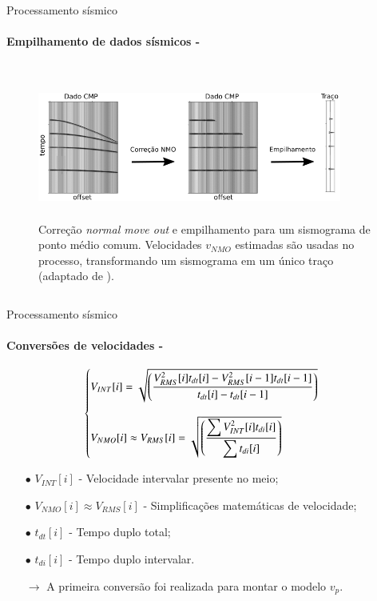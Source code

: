 \documentclass[xcolor=dvipsnames,t]{beamer}
\begin{document}
\begin{frame}{Processamento sísmico}
\framesubtitle{Empilhamento de dados sísmicos - }	

\begin{columns}[onlytextwidth, T]
	\begin{column}{.90\textwidth}
		\begin{figure}[h]
			\includegraphics[width=10cm,height=4.7cm]{../imagens/empilhamento.png}	
			\tiny{\caption{Correção \textit{normal move out} e empilhamento para um sismograma de ponto médio comum. Velocidades $v_{NMO}$ estimadas são usadas no processo, transformando um sismograma em um único traço (adaptado de ).}} 	
			\label{empilhamento}
		\end{figure}	
	\end{column}
\end{columns}	

\end{frame}
\begin{frame}{Processamento sísmico}
\framesubtitle{Conversões de velocidades - }	

\begin{equation}
	\begin{cases}
		\bigskip V_{INT}[i] =  \sqrt{\left(\dfrac{V_{RMS}^2[i] t_{dt}[i] - V_{RMS}^2[i-1] t_{dt}[i-1]}{t_{dt}[i] - t_{dt}[i-1]}\right)}  \\
		V_{NMO}[i] \approx V_{RMS}[i] = \sqrt{\left(\dfrac{\displaystyle\sum V_{INT}^2[i]t_{di}[i]}{\displaystyle\sum t_{di}[i]}\right)}
		\end{cases}
	\label{dix}
\end{equation}

\bigskip
\begin{itemize}
	\small
	\item[$\bullet$] $V_{INT}[i]$ - Velocidade intervalar presente no meio;
	\smallskip
	\item[$\bullet$] $V_{NMO}[i] \approx V_{RMS}[i]$ - Simplificações matemáticas de velocidade;
	\smallskip
	\item[$\bullet$] $t_{dt}[i]$ - Tempo duplo total;
	\smallskip
	\item[$\bullet$] $t_{di}[i]$ - Tempo duplo intervalar. 
	
	\item[$\to$] A primeira conversão foi realizada para montar o modelo $v_p$.
\end{itemize}

\end{frame}
\end{document}
